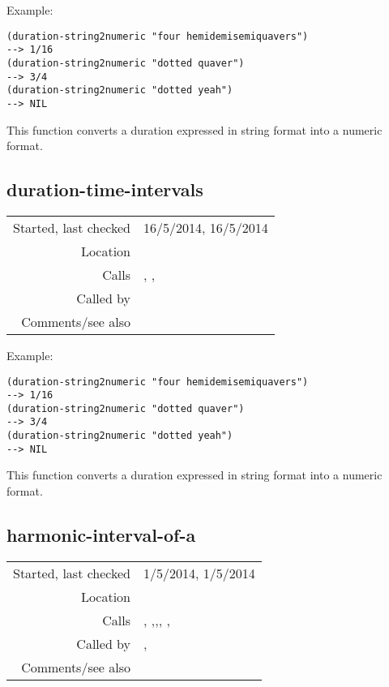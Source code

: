 \vspace{0.5cm}
\noindent Example:
\begin{verbatim}
(duration-string2numeric "four hemidemisemiquavers")
--> 1/16
(duration-string2numeric "dotted quaver")
--> 3/4
(duration-string2numeric "dotted yeah")
--> NIL
\end{verbatim}

\noindent This function converts a duration
expressed in string format into a numeric format.


\subsection*{duration-time-intervals}\label{fun:duration-time-intervals}

\vspace{0.3cm}
\begin{tabular}{r|p{8cm}}
Started, last checked & 16/5/2014, 16/5/2014 \\
Location & \nameref{sec:pitches-intervals-durations} \\
Calls & \nameref{fun:duration-string2numeric}, \nameref{fun:modify-question-by-staff-restriction}, \nameref{fun:restrict-dataset-in-nth-to-xs} \\
Called by & \\
Comments/see also &
\end{tabular}

\vspace{0.5cm}
\noindent Example:
\begin{verbatim}
(duration-string2numeric "four hemidemisemiquavers")
--> 1/16
(duration-string2numeric "dotted quaver")
--> 3/4
(duration-string2numeric "dotted yeah")
--> NIL
\end{verbatim}

\noindent This function converts a duration
expressed in string format into a numeric format.


\subsection*{harmonic-interval-of-a}\label{fun:harmonic-interval-of-a}

\vspace{0.3cm}
\begin{tabular}{r|p{8cm}}
Started, last checked & 1/5/2014, 1/5/2014 \\
Location & \nameref{sec:pitches-intervals-durations} \\
Calls & \nameref{fun:harmonic-interval-segments2raw-times}, \nameref{fun:interval-string2MNN-MPN-mods},\newline \nameref{fun:maximal-translatable-pattern},\newline \nameref{fun:orthogonal-projection-not-unique-equalp}, \nameref{fun:replace-all}, \nameref{fun:segments-strict} \\
Called by & \nameref{fun:Stravinsqi-Jun2014}, \\
Comments/see also & \nameref{fun:melodic-interval-of-a}
\end{tabular}

